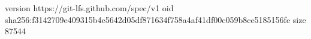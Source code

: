version https://git-lfs.github.com/spec/v1
oid sha256:f3142709e409315b4e5642d05df871634f758a4af41df00c059b8ce5185156fe
size 87544

